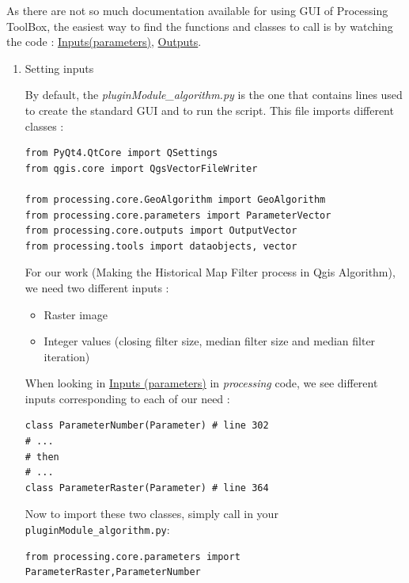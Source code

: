 \documentclass[a4paper,11pt,DIV=18]{scrartcl}
\begin{document}
As there are not so much documentation available for using GUI of Processing
ToolBox, the easiest way to find the functions and classes to call is by watching the code :
\href{https://github.com/qgis/QGIS/blob/master/python/plugins/processing/core/parameters.py}{Inputs(parameters)}, \href{https://github.com/qgis/QGIS/blob/master/python/plugins/processing/core/outputs.py}{Outputs}.

\begin{enumerate}
\item Setting inputs
\label{sec:orgdbb807c}

By default, the \emph{pluginModule\_algorithm.py} is the one that contains lines used to create the standard GUI and to run the script. This file imports different classes :
\begin{verbatim}
from PyQt4.QtCore import QSettings
from qgis.core import QgsVectorFileWriter

from processing.core.GeoAlgorithm import GeoAlgorithm
from processing.core.parameters import ParameterVector
from processing.core.outputs import OutputVector
from processing.tools import dataobjects, vector
\end{verbatim}

For our work (Making the Historical Map Filter process in Qgis Algorithm), we need two different inputs :
\begin{itemize}
\item Raster image
\item Integer values (closing filter size, median filter size and median filter iteration)
\end{itemize}

When looking in
\href{https://github.com/qgis/QGIS/blob/master/python/plugins/processing/core/parameters.py}{Inputs (parameters)} in \emph{processing} code, we see different inputs corresponding to each of our need :

\begin{verbatim}
class ParameterNumber(Parameter) # line 302
# ...
# then
# ...
class ParameterRaster(Parameter) # line 364
\end{verbatim}

Now to import these two classes, simply call in your \texttt{pluginModule\_algorithm.py}:
\begin{verbatim}
from processing.core.parameters import ParameterRaster,ParameterNumber
\end{verbatim}


\end{enumerate}
\end{document}
